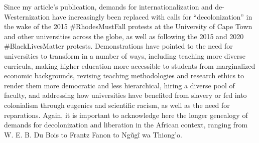 \documentclass{tufte-handout}
\begin{document}
Since my article's publication, demands for internationalization and
de-Westernization have increasingly been replaced with calls for
``decolonization'' in the wake of the 2015 \#RhodesMustFall protests at
the University of Cape Town and other universities across the globe, as
well as following the 2015 and 2020 \#BlackLivesMatter protests.
Demonstrations have pointed to the need for universities to transform in
a number of ways, including teaching more diverse curricula, making
higher education more accessible to students from marginalized economic
backgrounds, revising teaching methodologies and research ethics to
render them more democratic and less hierarchical, hiring a diverse pool
of faculty, and addressing how universities have benefited from slavery
or fed into colonialism through eugenics and scientific racism, as well
as the need for reparations. Again, it is important to acknowledge here
the longer genealogy of demands for decolonization and liberation in the
African context, ranging from W. E. B. Du Bois to Frantz Fanon to Ngũgĩ
wa Thiong'o.
\end{document}
